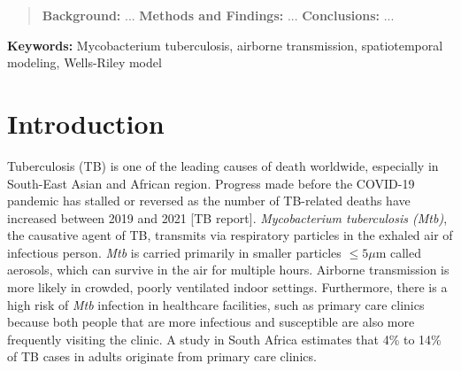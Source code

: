\documentclass[fleqn,11pt]{wlscirep}
\begin{document}

\begin{abstract}\normalfont
\noindent\textbf{Background:} ... \medskip
\noindent\textbf{Methods and Findings:} ... 
\medskip %
\noindent\textbf{Conclusions:} ... 

\par
\end{abstract}


\flushbottom
\maketitle
\setcounter{page}{1}
\thispagestyle{fancy}

\vspace{2em}


\vspace{0.5em}

\noindent\textbf{Keywords:} Mycobacterium tuberculosis, airborne transmission, spatiotemporal modeling, Wells-Riley model
\newpage

\sloppy
\raggedbottom

\newpage

\section{Introduction} 

Tuberculosis (TB) is one of the leading causes of death worldwide, especially in South-East Asian and African region\cite{WHO2022TBReport}. Progress made before the COVID-19 pandemic has stalled or reversed as the number of TB-related deaths have increased between 2019 and 2021 [TB report]. \emph{Mycobacterium tuberculosis (Mtb)}, the causative agent of TB, transmits via respiratory particles in the exhaled air of infectious person\cite{Rieder1999,Patterson2021Tuberculosis}. \emph{Mtb} is carried primarily in smaller particles $\leq5\mu$m called aerosols\cite{Fennelly2020Lancet}, which can survive in the air for multiple hours\cite{Loudon1969AMRRD}. Airborne transmission is more likely in crowded, poorly ventilated indoor settings\cite{Rieder1999,CPS2013Book,Nardell1991ARRD,Wang2021Science,Morawska2021}. Furthermore, there is a high risk of \emph{Mtb} infection in healthcare facilities, such as primary care clinics because both people that are more infectious and susceptible are also more frequently visiting the clinic\cite{McCreesh2020IJTLD}. A study in South Africa estimates that 4\% to 14\% of TB cases in adults originate from primary care clinics\cite{McCreesh2022BMJGlobalHealth}.
\end{document}
